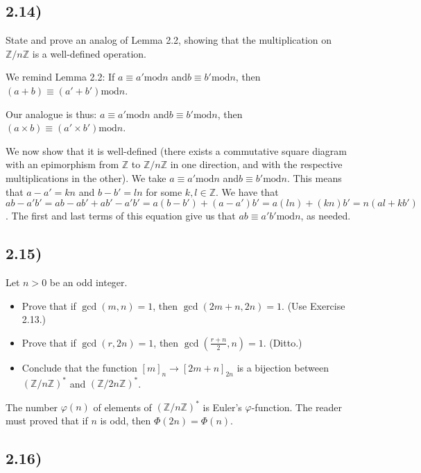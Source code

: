 \documentclass[12pt, letterpaper, twoside]{report}
\begin{document}
\subsection*{2.14)}

State and prove an analog of Lemma 2.2, showing that the multiplication on $\mathbb{Z}/n\mathbb{Z}$ is a well-defined operation.

We remind Lemma 2.2:  If $a \equiv a' \text{mod} n$ and$ b \equiv b' \text{mod} n$, then $(a + b) \equiv (a' + b') \text{mod} n$.

Our analogue is thus: $a \equiv a' \text{mod} n$ and$ b \equiv b' \text{mod} n$, then $(a \times b) \equiv (a' \times b') \text{mod} n$.

We now show that it is well-defined (there exists a commutative square diagram with an epimorphism from $\mathbb{Z}$ to $\mathbb{Z}/n\mathbb{Z}$ in one direction, and with the respective multiplications in the other). We take $a \equiv a' \text{mod} n$ and$ b \equiv b' \text{mod} n$. This means that $a - a' = kn$ and $b - b' = ln$ for some $k, l \in \mathbb{Z}$. We have that $ab - a'b' = ab - ab' + ab' - a'b' = a(b - b') + (a - a')b' = a(ln) + (kn)b' = n(al + kb')$. The first and last terms of this equation give us that $ab \equiv a'b' \text{mod} n$, as needed. 


\subsection*{2.15)}

Let $n > 0$ be an odd integer.
\begin{itemize}
	\item Prove that if $\gcd(m, n) = 1$, then $\gcd(2m + n, 2n) = 1$. (Use Exercise 2.13.)
	\item Prove that if $\gcd(r, 2n) = 1$, then $\gcd(\frac{r+n}{2}, n) = 1$. (Ditto.)
	\item Conclude that the function $[m]_n \to [2m + n]_{2n}$ is a bijection between $(\mathbb{Z}/n\mathbb{Z})^*$ and $(\mathbb{Z}/2n\mathbb{Z})^*$.
\end{itemize}

The number $\varphi(n)$ of elements of $(\mathbb{Z}/n\mathbb{Z})^*$ is Euler's $\varphi$-function. The reader must proved that if $n$ is odd, then $\Phi(2n) = \Phi(n)$.


\subsection*{2.16)} 
\end{document}
